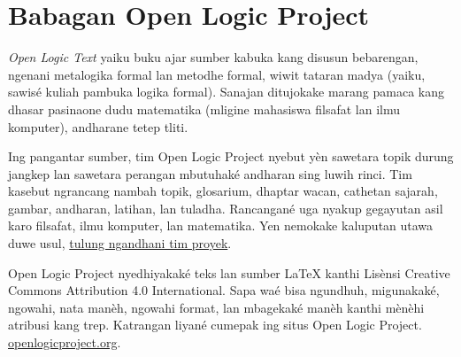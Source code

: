 \chapter*{Babagan Open Logic Project}


\textit{Open Logic Text} yaiku buku ajar sumber kabuka kang disusun
bebarengan, ngenani metalogika formal lan metodhe formal, wiwit tataran
madya (yaiku, sawisé kuliah pambuka logika formal). Sanajan ditujokake
marang pamaca kang dhasar pasinaone dudu matematika (mligine mahasiswa
filsafat lan ilmu komputer), andharane tetep tliti.

Ing pangantar sumber, tim Open Logic Project nyebut yèn sawetara
topik durung jangkep lan sawetara perangan mbutuhaké andharan
sing luwih rinci.
Tim kasebut ngrancang nambah topik, glosarium, dhaptar wacan,
cathetan sajarah, gambar, andharan, latihan, lan tuladha.
Rancangané uga nyakup gegayutan asil karo filsafat, ilmu komputer,
lan matematika.
Yen nemokake kaluputan utawa duwe usul,
\href{https://github.com/OpenLogicProject/OpenLogic/wiki/Contributing}{tulung ngandhani tim proyek}.

Open Logic Project nyedhiyakaké teks lan sumber LaTeX kanthi
Lisènsi Creative Commons Attribution 4.0 International. Sapa waé
bisa ngundhuh, migunakaké, ngowahi, nata manèh, ngowahi format,
lan mbagekaké manèh kanthi mènèhi atribusi kang trep.
Katrangan liyané cumepak ing situs Open Logic Project.
\href{http://openlogicproject.org/}{openlogicproject.org}.
